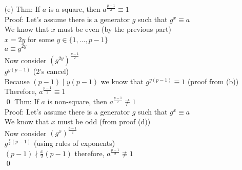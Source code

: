 \documentclass[11pt]{article}
\theoremstyle{definition}
\begin{document}
\begin{enumerate}
	\item[(e)]
	Thm: If $a$ is a square, then $a^{\frac{p-1}{2}} \equiv 1$\\
	\newline
	Proof: Let's assume there is a generator $g$ such that $g^x \equiv a$\\
	We know that $x$ must be even (by the previous part)\\
	$x = 2y$ for some $y \in \{1,...,p-1\}$\\
	$a \equiv g^{2y}$\\
	Now consider $(g^{2y})^{\frac{p-1}{2}}$\\
	$g^{y(p-1)}$ (2's cancel)\\
	Because $(p-1) \mid y(p-1)$ we know that $g^{y(p-1)} \equiv 1$ (proof from (b))\\
	Therefore, $a^{\frac{p-1}{2}} \equiv 1$\\
	\qed
	\newline
	Thm: If $a$ is non-square, then $a^{\frac{p-1}{2}} \not\equiv 1$\\
	\newline
	Proof: Let's assume there is a generator $g$ such that $g^x \equiv a$\\
	We know that $x$ must be odd (from proof (d))\\
	Now consider $(g^{x})^{\frac{p-1}{2}}$\\
	$g^{\frac{x}{2}(p-1)}$ (using rules of exponents)\\
	$(p-1) \nmid \frac{x}{2}(p-1)$ therefore, $a^{\frac{p-1}{2}} \not\equiv 1$\\
	\qed
	

\end{enumerate}
\end{document}
